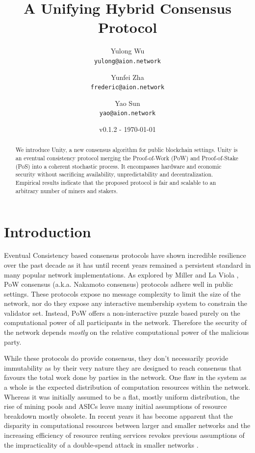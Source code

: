 \documentclass[a4paper]{article}
\title{A Unifying Hybrid Consensus Protocol}
\author{
  Yulong Wu\\
  \texttt{yulong@aion.network}
  \and
  Yunfei Zha\\
  \texttt{frederic@aion.network}
  \and
  Yao Sun\\
  \texttt{yao@aion.network}
}
\date{v0.1.2 - \today}
\begin{document}
\maketitle

\begin{abstract}
We introduce Unity, a new consensus algorithm for public blockchain settings. Unity is an eventual consistency protocol merging the Proof-of-Work (PoW) and Proof-of-Stake (PoS) into a coherent stochastic process. It encompasses hardware and economic security without sacrificing availability, unpredictability and decentralization. Empirical results indicate that the proposed protocol is fair and scalable to an arbitrary number of miners and stakers.
\end{abstract}
\clearpage

\tableofcontents
\clearpage

\section{Introduction}

Eventual Consistency based consensus protocols have shown incredible resilience over the past decade as it has until recent years remained a persistent standard in many popular network implementations. As explored by Miller and La Viola \cite{miller2014anonymous}, PoW consensus (a.k.a. Nakamoto consensus) protocols adhere well in public settings. These protocols expose no message complexity to limit the size of the network, nor do they expose any interactive membership system to constrain the validator set. Instead, PoW offers a non-interactive puzzle based purely on the computational power of all participants in the network. Therefore the security of the network depends \textit{mostly} on the relative computational power of the malicious party.

While these protocols do provide consensus, they don't necessarily provide immutability as by their very nature they are designed to reach consensus that favours the total work done by parties in the network. One flaw in the system as a whole is the expected distribution of computation resources within the network. Whereas it was initially assumed to be a flat, mostly uniform distribution, the rise of mining pools \cite{aliaga2018} and ASICs \cite{monerocrusher2019} leave many initial assumptions of resource breakdown mostly obsolete. In recent years it has become apparent that the disparity in computational resources between larger and smaller networks and the increasing efficiency of resource renting services revokes previous assumptions of the impracticality of a double-spend attack in smaller networks \cite{sinnige2018}.
\end{document}

